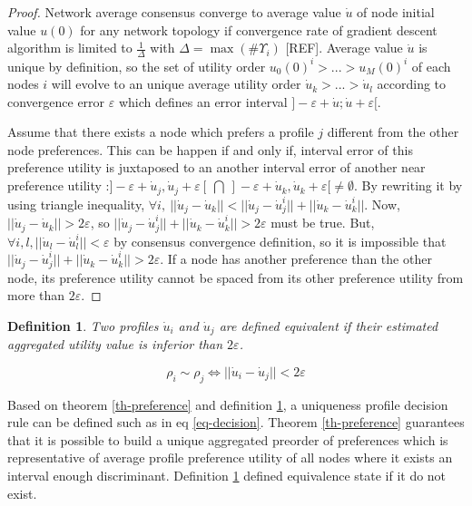 \documentclass[conference]{IEEEtran}
\newtheorem{definition}{Definition}
\begin{document}
\begin{proof}
Network average consensus converge to average value $\dot{u}$ of node initial value $u(0)$ for any network topology if convergence rate of gradient descent algorithm is limited to $\frac{1}{\Delta}$ with $\Delta = \max(\#\Upsilon_i)$ [REF]. Average value $\dot{u}$ is unique by definition, so the set of utility order $u_0(0)^i > ... > u_M(0)^i$ of each nodes $i$ will evolve to an unique average utility order $\dot{u}_k > ... > \dot{u}_l$ according to convergence error $\varepsilon$ which defines an error interval $]- \varepsilon + \dot{u} ; \dot{u} + \varepsilon [$. 

Assume that there exists a node which prefers a profile $j$ different from the other node preferences. This can be happen if and only if, interval error of this preference utility is juxtaposed to an another interval error of another near preference utility :$]-\varepsilon + \dot{u}_j, \dot{u}_j + \varepsilon [ \ \bigcap \ ]-\varepsilon + \dot{u}_k, \dot{u}_k + \varepsilon [ \not = \emptyset $. By rewriting it by using triangle inequality, $ \forall i, \  ||\dot{u}_j - \dot{u}_k|| < ||\dot{u}_j - \dot{u}_j^i || + ||\dot{u}_k - \dot{u}_k^i||$. Now, $|| \dot{u}_j - \dot{u}_k|| > 2 \varepsilon$, so $||\dot{u}_j - \dot{u}_j^i || + ||\dot{u}_k - \dot{u}_k^i|| > 2 \varepsilon$ must be true. But, $\forall i,l, ||\dot{u}_l - \dot{u}_l^i|| < \varepsilon$ by consensus convergence definition, so it is impossible that $||\dot{u}_j - \dot{u}_j^i || + ||\dot{u}_k - \dot{u}_k^i|| > 2 \varepsilon$. If a node has another preference than the other node, its preference utility cannot be spaced from its other preference utility from more than $2 \varepsilon$.
\end{proof}

\begin{definition}
\label{def-equivalent}
Two profiles $\dot{u}_i$ and $\dot{u}_j$ are defined equivalent if their estimated aggregated utility value is inferior than $2 \varepsilon$.
\end{definition}
\begin{equation}
\label{eq-decision-equivalent}
\rho_i \sim \rho_j  \Longleftrightarrow ||\dot{u}_i - \dot{u}_j|| < 2 \varepsilon 
\end{equation}

Based on theorem \ref{th-preference} and definition \ref{def-equivalent}, a uniqueness profile decision rule can be defined such as in eq \ref{eq-decision}. Theorem \ref{th-preference} guarantees that it is possible to build a unique aggregated preorder of preferences which is representative of average profile preference utility of all nodes where it exists an interval enough discriminant. Definition \ref{def-equivalent} defined equivalence state if it do not exist.\\
\end{document}
